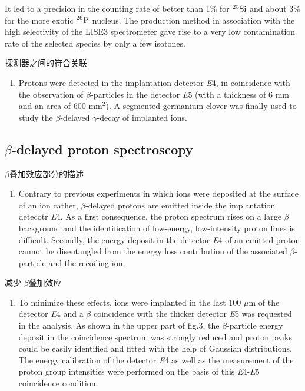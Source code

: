 \documentclass[UTF8]{ctexart}
\begin{document}
 It led to a precision in the counting rate of better than 1\% for $^{25}\textnormal{Si}$ and about 3\% for the more exotic $^{26}\textnormal{P}$ nucleus. The production method in association with the high selectivity of the LISE3 spectrometer gave rise to a very low contamination rate of the selected species by only a few isotones.

探测器之间的符合关联
\begin{enumerate}
    \item Protons were detected in the implantation detector \textit{E}4, in coincidence with the observation of $\beta$-particles in the detector \textit{E}5 (with a thickness of 6 mm and an area of 600 mm$^{2}$). A segmented germanium clover was finally used to study the $\beta$-delayed $\gamma$-decay of implanted ions.
\end{enumerate}

\subsection{$\beta$-delayed proton spectroscopy}
$\beta$叠加效应部分的描述
\begin{enumerate}
    \item Contrary to previous experiments in which ions were deposited at the surface of an ion cather, $\beta$-delayed protons are emitted inside the implantation detecotr \textit{E}4. As a first consequence, the proton spectrum rises on a large $\beta$ background and the identification of low-energy, low-intensity proton lines is difficult. Secondly, the energy deposit in the detector \textit{E}4 of an emitted proton cannot be disentangled from the energy loss contribution of the associated $\beta$-particle and the recoiling ion.
\end{enumerate}

减少 $\beta$叠加效应
\begin{enumerate}
    \item To minimize these effects, ions were implanted in the last 100 $\mu$m of the detector \textit{E}4 and a $\beta$ coincidence with the thicker detector \textit{E}5 was requested in the analysis. As shown in the upper part of fig.3, the $\beta$-particle energy deposit in the coincidence spectrum was strongly reduced and proton peaks could be easily identified and fitted with the help of Gaussian distributions. The energy calibration of the detector \textit{E}4 as well as the measurement of the proton group intensities were performed on the basis of this \textit{E}4-\textit{E}5 coincidence condition.
\end{enumerate}
\end{document}
